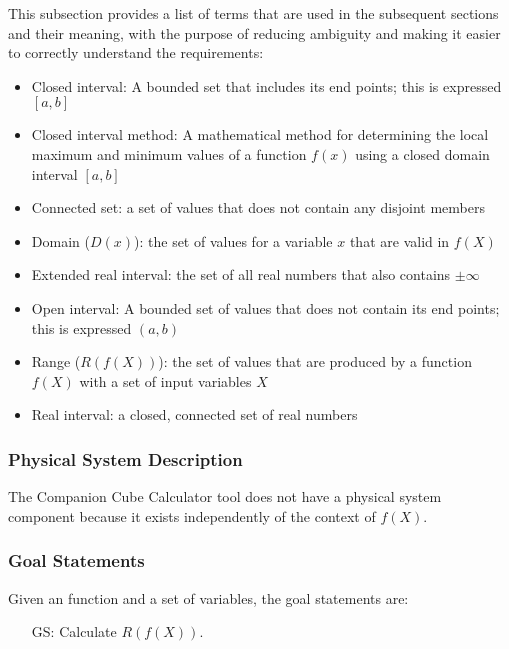 \documentclass[12pt]{article}
\newcounter{goalnum} %
\newcommand{\progname}{Companion Cube Calculator} %
\begin{document}
This subsection provides a list of terms that are used in the subsequent
sections and their meaning, with the purpose of reducing ambiguity and making it
easier to correctly understand the requirements:

\begin{itemize}

\item Closed interval: A bounded set that includes its end points; this is 
expressed $[a,b]$
\item Closed interval method: A mathematical method for determining the local 
maximum and minimum values of a function $f(x)$ using a closed domain interval 
$[a,b]$
\item Connected set: a set of values that does not contain any disjoint members
\item Domain ($D(x)$): the set of values for a variable $x$ that are valid in 
$f(X)$
\item Extended real interval: the set of all real numbers that also contains 
$\pm \infty$
\item Open interval: A bounded set of values that does not contain its end 
points; this is expressed $(a,b)$
\item Range ($R(f(X))$): the set of values that are produced by a function 
$f(X)$ with a set of input variables $X$
\item Real interval: a closed, connected set of real numbers

\end{itemize}

\subsubsection{Physical System Description}

The \progname{} tool does not have a physical system component because it 
exists independently of the context of $f(X)$. 

\subsubsection{Goal Statements}

\noindent Given an function and a set of variables, the goal statements are:

\begin{itemize}

\item[GS\refstepcounter{goalnum}\thegoalnum \label{G_range}:] 
Calculate $R(f(X))$.


\end{itemize}
\end{document}
